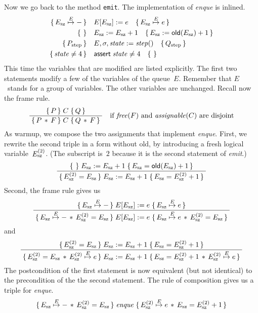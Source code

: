 \documentclass{article} %
\newcommand{\3}[3]{\{\,#1\,\}\;#2\;\{\,#3\,\}}
\newcommand{\eto}{\stackrel E\mapsto}
\newcommand{\infer}[2]{\frac{\displaystyle\;#1\;}{\displaystyle\;#2\;}}
\renewcommand{\*}{\,*\,}
\begin{document}
Now we go back to the method {\tt emit}.
The implementation of {\it enque\/} is inlined.
\begin{align*}
  \{\,E_{\rm sz}\eto-\,\}
  \quad&E[E_{\rm sz}]:=e
  \quad\{\,E_{\rm sz}\eto e\,\} \\
\{\,\,\}
  \quad&E_{\rm sz}:=E_{\rm sz}+1
  \quad\{\,E_{\rm sz}:={\sf old}(E_{\rm sz})+1\,\} \\
\{\,P_{\rm step}\,\}\quad&E,\sigma,{\it state}:={\it step}()\quad
  \{\,Q_{\rm step}\,\} \\
\{\,{\it state}\ne4\,\}\quad&{\sf assert}\;{\it state}\ne4\quad\{\,\,\}
\end{align*}
This time the variables that are modified are listed explicitly.
The first two statements modify a few of the variables of the queue~$E$.
Remember that $E$~stands for a group of variables.
The other variables are unchanged.
Recall now the frame rule.
\[\infer
  {\3{P}{C}{Q}}
  {\3{P\*F}{C}{Q\*F}}
  \quad\text{if ${\it free}(F)$ and ${\it assignable}(C)$ are disjoint}
\]
As warmup, we compose the two assignments that implement {\it enque}.
First, we rewrite the second triple in a form without {\sf old}, by introducing a fresh logical variable~$E^{(2)}_{\rm sz}$.
(The subscript is~$2$ because it is the second statement of {\it emit}.)
\[\infer
  {\3{}{E_{\rm sz}:=E_{\rm sz}+1}{E_{\rm sz}={\sf old}(E_{\rm sz})+1}}
  {\3
    {E^{(2)}_{\rm sz}=E_{\rm sz}}
    {E_{\rm sz}:=E_{\rm sz}+1}
    {E_{\rm sz}=E^{(2)}_{\rm sz}+1}}
  \]
Second, the frame rule gives us
\[\infer
  {\3
    {E_{\rm sz}\eto-}
    {E[E_{\rm sz}]:=e}
    {E_{\rm sz}\eto e}}
  {\3
    {E_{\rm sz}\eto-\*E^{(2)}_{\rm sz}=E_{\rm sz}}
    {E[E_{\rm sz}]:=e}
  {E_{\rm sz}\eto e\*E^{(2)}_{\rm sz}=E_{\rm sz}}} \]
and
\[\infer
  {\3
    {E^{(2)}_{\rm sz}=E_{\rm sz}}
    {E_{\rm sz}:=E_{\rm sz}+1}
    {E_{\rm sz}=E^{(2)}_{\rm sz}+1}}
  {\3
    {E^{(2)}_{\rm sz}=E_{\rm sz}\*E^{(2)}_{\rm sz}\eto e}
    {E_{\rm sz}:=E_{\rm sz}+1}
    {E_{\rm sz}=E^{(2)}_{\rm sz}+1\*E^{(2)}_{\rm sz}\eto e}}
\]
The postcondition of the first statement is now equivalent (but not identical) to the precondition of the the second statement.
The rule of composition gives us a triple for {\it enque}.
\[\3
  {E_{\rm sz}\eto-\*E^{(2)}_{\rm sz}=E_{\rm sz}}
  {{\it enque}}
  {E^{(2)}_{\rm sz}\eto e\*E_{\rm sz}=E^{(2)}_{\rm sz}+1} \]

\medskip
\end{document}
